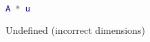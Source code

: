 \begin{lstlisting}[language=Matlab]
A * u
\end{lstlisting}

\begin{solution}
Undefined (incorrect dimensions)
\end{solution}